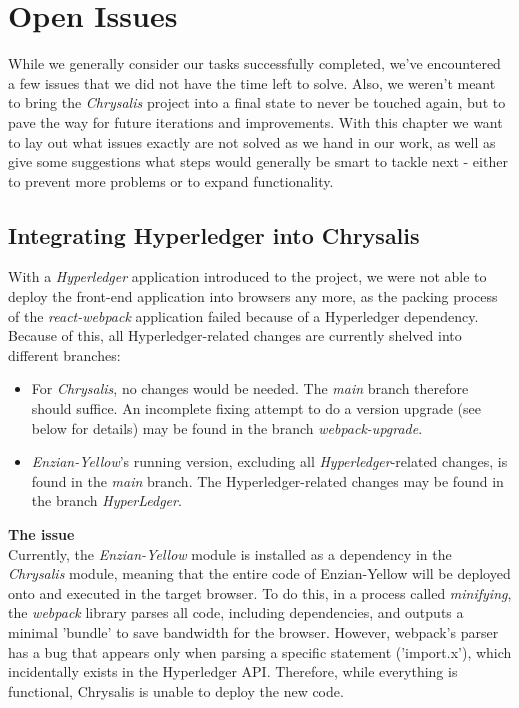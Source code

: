 %
\chapter{Open Issues}
\label{sec:issues}

While we generally consider our tasks successfully completed, we've encountered a few issues that we did not have the time left to solve. Also, we weren't meant to bring the \emph{Chrysalis} project into a final state to never be touched again, but to pave the way for future iterations and improvements.\newline
With this chapter we want to lay out what issues exactly are not solved as we hand in our work, as well as give some suggestions what steps would generally be smart to tackle next - either to prevent more problems or to expand functionality. 

\section{Integrating Hyperledger into Chrysalis}
\label{sec:issues:integration}

With a \emph{Hyperledger} application introduced to the project, we were not able to deploy the front-end application into browsers any more, as the packing process of the \emph{react-webpack} application failed because of a Hyperledger dependency. Because of this, all Hyperledger-related changes are currently shelved into different branches:
\begin{itemize}
    \item For \emph{Chrysalis}, no changes would be needed. The \emph{main} branch therefore should suffice. An incomplete fixing attempt to do a version upgrade (see below for details) may be found in the branch \emph{webpack-upgrade}.
    \item \emph{Enzian-Yellow}'s running version, excluding all \emph{Hyperledger}-related changes, is found in the \emph{main} branch. The Hyperledger-related changes may be found in the branch \emph{HyperLedger}.
\end{itemize}

\textbf{The issue} \\[0.2em]
Currently, the \emph{Enzian-Yellow} module is installed as a dependency in the \emph{Chrysalis} module, meaning that the entire code of Enzian-Yellow will be deployed onto and executed in the target browser. To do this, in a process called \emph{minifying}, the \emph{webpack} library parses all code, including dependencies, and outputs a minimal 'bundle' to save bandwidth for the browser. However, webpack's parser has a bug that appears only when parsing a specific statement ('import.x'), which incidentally exists in the Hyperledger API. Therefore, while everything is functional, Chrysalis is unable to deploy the new code.

